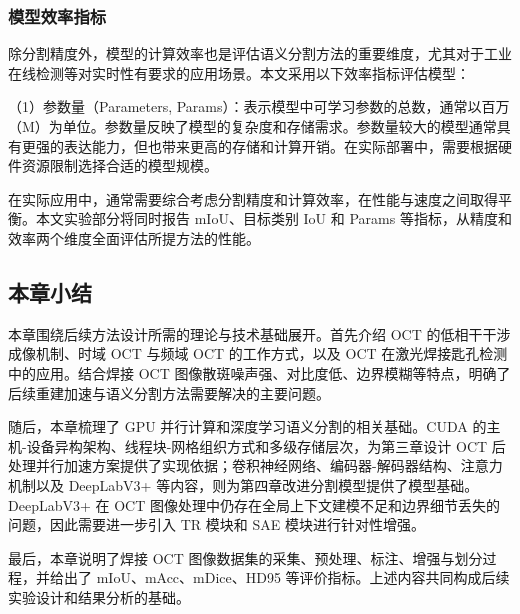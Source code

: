 \subsubsection{模型效率指标}

除分割精度外，模型的计算效率也是评估语义分割方法的重要维度，尤其对于工业在线检测等对实时性有要求的应用场景。本文采用以下效率指标评估模型：

（1）参数量（Parameters, Params）：表示模型中可学习参数的总数，通常以百万（M）为单位。参数量反映了模型的复杂度和存储需求。参数量较大的模型通常具有更强的表达能力，但也带来更高的存储和计算开销。在实际部署中，需要根据硬件资源限制选择合适的模型规模。

在实际应用中，通常需要综合考虑分割精度和计算效率，在性能与速度之间取得平衡。本文实验部分将同时报告 mIoU、目标类别 IoU 和 Params 等指标，从精度和效率两个维度全面评估所提方法的性能。

\subsection{本章小结}

本章围绕后续方法设计所需的理论与技术基础展开。首先介绍 OCT 的低相干干涉成像机制、时域 OCT 与频域 OCT 的工作方式，以及 OCT 在激光焊接匙孔检测中的应用。结合焊接 OCT 图像散斑噪声强、对比度低、边界模糊等特点，明确了后续重建加速与语义分割方法需要解决的主要问题。

随后，本章梳理了 GPU 并行计算和深度学习语义分割的相关基础。CUDA 的主机-设备异构架构、线程块-网格组织方式和多级存储层次，为第三章设计 OCT 后处理并行加速方案提供了实现依据；卷积神经网络、编码器-解码器结构、注意力机制以及 DeepLabV3+ 等内容，则为第四章改进分割模型提供了模型基础。DeepLabV3+ 在 OCT 图像处理中仍存在全局上下文建模不足和边界细节丢失的问题，因此需要进一步引入 TR 模块和 SAE 模块进行针对性增强。

最后，本章说明了焊接 OCT 图像数据集的采集、预处理、标注、增强与划分过程，并给出了 mIoU、mAcc、mDice、HD95 等评价指标。上述内容共同构成后续实验设计和结果分析的基础。
